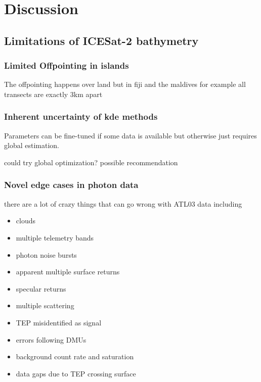 \chapter{Discussion}


\section{Limitations of ICESat-2 bathymetry}
\subsection{Limited Offpointing in islands}
The offpointing happens over land but in fiji and the maldives for example all transects are exactly 3km apart
\subsection{Inherent uncertainty of kde methods}
Parameters can be fine-tuned if some data is available but otherwise just requires global estimation.

could try global optimization? possible recommendation 
\subsection{Novel edge cases in photon data}\label{sec:discussion-photon-issues}
there are a lot of crazy things that can go wrong with ATL03 data including

\begin{itemize}
    \item clouds
    \item multiple telemetry bands
    \item photon noise bursts %
    \item apparent multiple surface returns %
    \item specular returns
    \item multiple scattering %
    \item TEP misidentified as signal %
    \item errors following DMUs %
    \item background count rate and saturation
    \item data gaps due to TEP crossing surface %
\end{itemize}

